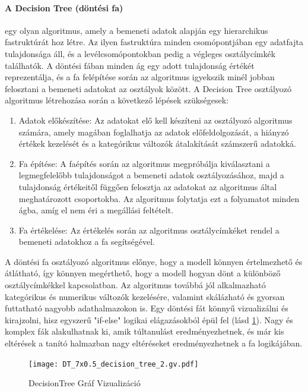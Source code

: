 \documentclass[12pt,a4paper]{article}
\begin{document}
\paragraph{A Decision Tree (döntési fa)} egy olyan algoritmus, amely a bemeneti adatok alapján egy hierarchikus fastruktúrát hoz létre. Az ilyen fastruktúra minden csomópontjában egy adatfajta tulajdonsága áll, és a levélcsomópontokban pedig a végleges osztálycímkék találhatók. A döntési fában minden ág egy adott tulajdonság értékét reprezentálja, és a fa felépítése során az algoritmus igyekszik minél jobban felosztani a bemeneti adatokat az osztályok között.
A Decision Tree osztályozó algoritmus létrehozása során a következő lépések szükségesek:
\begin{enumerate}
    \item Adatok előkészítése: Az adatokat elő kell készíteni az osztályozó algoritmus számára, amely magában foglalhatja az adatok előfeldolgozását, a hiányzó értékek kezelését és a kategórikus változók átalakítását számszerű adatokká.
    \item Fa építése: A faépítés során az algoritmus megpróbálja kiválasztani a legmegfelelőbb tulajdonságot a bemeneti adatok osztályozásához, majd a tulajdonság értékeitől függően felosztja az adatokat az algoritmus által meghatározott csoportokba. Az algoritmus folytatja ezt a folyamatot minden ágba, amíg el nem éri a megállási feltételt.
    \item Fa értékelése: Az értékelés során az algoritmus osztálycímkéket rendel a bemeneti adatokhoz a fa segítségével.
\end{enumerate}
A döntési fa osztályozó algoritmus előnye, hogy a modell könnyen értelmezhető és átlátható, így könnyen megérthető, hogy a modell hogyan dönt a különböző osztálycímkékkel kapcsolatban. Az algoritmus továbbá jól alkalmazható kategórikus és numerikus változók kezelésére, valamint skálázható és gyorsan futtatható nagyobb adathalmazokon is.
Egy döntési fát könnyű vizualizálni és kirajzolni, hisz egyszerű "if-else" logikai elágazásokból épül fel (lásd \ref{DTVis}). Nagy és komplex fák alakulhatnak ki, amik túltanulást eredményezhetnek, és már kis eltérések a tanító halmazban nagy eltéréseket eredményezhetnek a fa logikájában.

\begin{figure}[htbp]
    \centering
    \texttt{[image: DT\_7x0.5\_decision\_tree\_2.gv.pdf]}
    \caption{DecisionTree Gráf Vizualizáció}
    \label{DTVis}
\end{figure}
\end{document}
